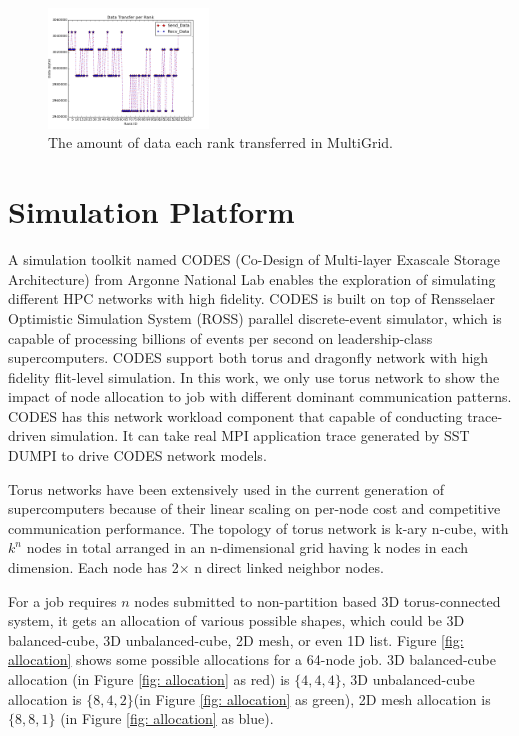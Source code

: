 \documentclass[conference]{IEEEtran}
\begin{document}
\begin{figure}[h!] 
  \centering
  \includegraphics[width=0.38\textwidth]{figs/appstudy/mg/mg_data_transfer}
   \caption{The amount of data each rank transferred in MultiGrid. }
   \label{fig: cr data trans}
\end{figure}


\section{Simulation Platform}
\label{sec:simulation}

A simulation toolkit named CODES (Co-Design of Multi-layer Exascale Storage Architecture) from Argonne National Lab enables the exploration of simulating different HPC networks with high fidelity\cite{Jason-2011}\cite{mubarak-sc2012}. CODES is built on top of Rensselaer Optimistic Simulation System (ROSS) parallel discrete-event simulator, which is capable of processing billions of events per second on leadership-class supercomputers\cite{ross}. CODES support both torus and dragonfly network with high fidelity flit-level simulation. In this work, we only use torus network to show the impact of node allocation to job with different dominant communication patterns. CODES has this network workload component that capable of conducting trace-driven simulation. It can take real MPI application trace generated by SST DUMPI\cite{sst} to drive CODES network models. 


Torus networks have been extensively used in the current generation of supercomputers because of their linear scaling on per-node cost and competitive communication performance. The topology of torus network is k-ary n-cube, with $k^n$ nodes in total arranged in an n-dimensional grid having k nodes in each dimension. Each node has 2$\times$ n direct linked neighbor nodes. 

For a job requires $n$ nodes submitted to non-partition based 3D torus-connected system, it gets an allocation of various possible shapes, which could be 3D balanced-cube, 3D unbalanced-cube, 2D mesh, or even 1D list. Figure \ref{fig: allocation} shows some possible allocations for a 64-node job. 3D balanced-cube allocation (in Figure \ref{fig: allocation} as red) is $\{4,4,4\}$, 3D unbalanced-cube allocation is $\{8,4,2\}$(in Figure \ref{fig: allocation} as green), 2D mesh allocation is $\{8,8,1\}$ (in Figure \ref{fig: allocation} as blue).
\end{document}
